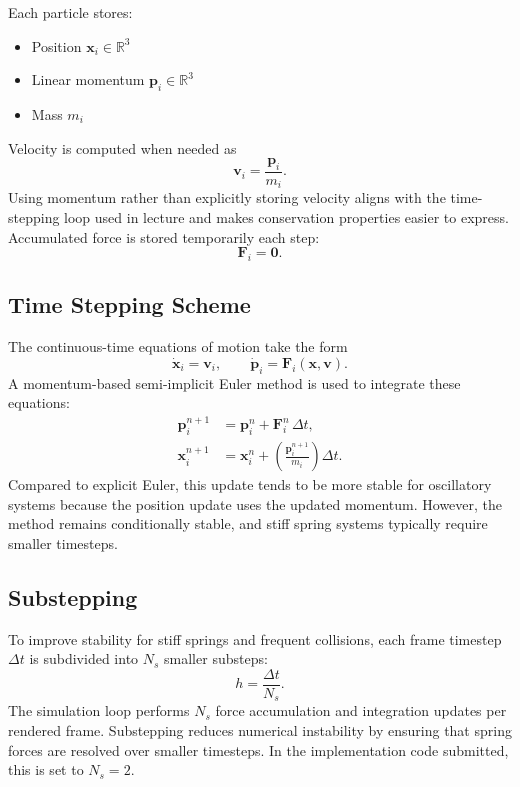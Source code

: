 \documentclass[manuscript,nonacm,12pt,letterpaper]{acmart}
\begin{document}
Each particle stores:
\begin{itemize}
    \item Position $\mathbf{x}_i \in \mathbb{R}^3$
    \item Linear momentum $\mathbf{p}_i \in \mathbb{R}^3$
    \item Mass $m_i$
\end{itemize}
Velocity is computed when needed as
\begin{equation}
\mathbf{v}_i = \frac{\mathbf{p}_i}{m_i}.
\label{eq:impl_velocity_from_momentum}
\end{equation}
Using momentum rather than explicitly storing velocity aligns with the time-stepping loop used in lecture and makes conservation properties easier to express. Accumulated force is stored temporarily each step:
\[
\mathbf{F}_i = \mathbf{0}.
\]

\subsection{Time Stepping Scheme}
\label{Sec6.2:TimeStepping}

The continuous-time equations of motion take the form
\begin{equation}
\dot{\mathbf{x}}_i = \mathbf{v}_i,
\qquad
\dot{\mathbf{p}}_i = \mathbf{F}_i(\mathbf{x},\mathbf{v}).
\label{eq:impl_first_order_form}
\end{equation}
A momentum-based semi-implicit Euler method is used to integrate these equations:
\begin{align}
\mathbf{p}_i^{n+1} &= \mathbf{p}_i^{n} + \mathbf{F}_i^{n}\,\Delta t, \label{eq:impl_momentum_update}\\
\mathbf{x}_i^{n+1} &= \mathbf{x}_i^{n} + \left(\frac{\mathbf{p}_i^{n+1}}{m_i}\right)\Delta t. \label{eq:impl_position_update}
\end{align}
Compared to explicit Euler, this update tends to be more stable for oscillatory systems because the position update uses the updated momentum. However, the method remains conditionally stable, and stiff spring systems typically require smaller timesteps.

\subsection{Substepping}
\label{Sec6.3:Substepping}

To improve stability for stiff springs and frequent collisions, each frame timestep $\Delta t$ is subdivided into $N_s$ smaller substeps:
\begin{equation}
h = \frac{\Delta t}{N_s}.
\end{equation}
The simulation loop performs $N_s$ force accumulation and integration updates per rendered frame. Substepping reduces numerical instability by ensuring that spring forces are resolved over smaller timesteps. In the implementation code submitted, this is set to $N_s = 2$.
\end{document}
